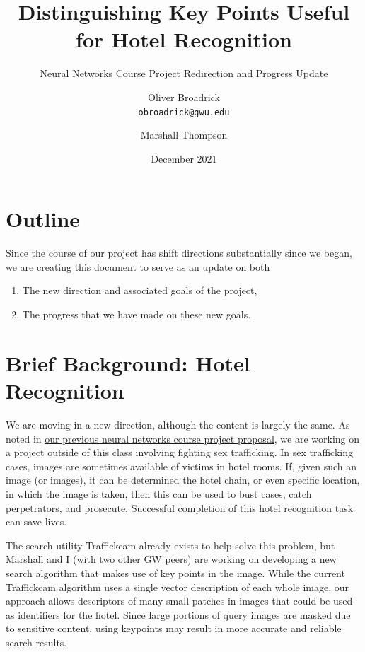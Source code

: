 \documentclass{scrartcl}
\title{Distinguishing Key Points Useful for Hotel Recognition}
\subtitle{Neural Networks Course Project Redirection and Progress Update}
\date{December 2021}
\author{
  Oliver Broadrick\\
  \texttt{obroadrick@gwu.edu}
  \and
  Marshall Thompson
}
\begin{document}
\maketitle

\section{Outline}

Since the course of our project has shift directions substantially since we began, we are creating this document to serve as an update on both 
\begin{enumerate}
\item
The new direction and associated goals of the project,
\item
The progress that we have made on these new goals.
\end{enumerate}

\section{Brief Background: Hotel Recognition}
We are moving in a new direction, although the content is largely the same. As noted in \href{./initial_proposal.pdf}{our previous neural networks course project proposal}, we are working on a project outside of this class involving fighting sex trafficking. In sex trafficking cases, images are sometimes available of victims in hotel rooms. If, given such an image (or images), it can be determined the hotel chain, or even specific location, in which the image is taken, then this can be used to bust cases, catch perpetrators, and prosecute. Successful completion of this hotel recognition task can save lives.

The search utility Traffickcam already exists to help solve this problem, but Marshall and I (with two other GW peers) are working on developing a new search algorithm that makes use of key points in the image. While the current Traffickcam algorithm uses a single vector description of each whole image, our approach allows descriptors of many small patches in images that could be used as identifiers for the hotel. Since large portions of query images are masked due to sensitive content, using keypoints may result in more accurate and reliable search results.
\end{document}
